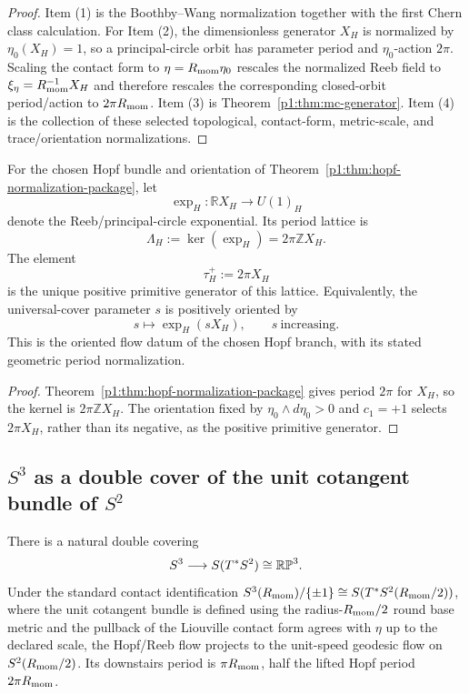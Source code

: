 \documentclass[11pt]{article}
\begin{document}
\begin{proof}
Item (1) is the Boothby--Wang normalization together with the first Chern class calculation. For Item (2), the dimensionless generator \(X_H\) is normalized by \(\eta_0(X_H)=1\), so a principal-circle orbit has parameter period and \(\eta_0\)-action \(2\pi\). Scaling the contact form to \(\eta=R_{\mathrm{mom}}\eta_0\) rescales the normalized Reeb field to \(\xi_\eta=R_{\mathrm{mom}}^{-1}X_H\) and therefore rescales the corresponding closed-orbit period/action to \(2\pi R_{\mathrm{mom}}\). Item (3) is Theorem~\ref{p1:thm:mc-generator}. Item (4) is the collection of these selected topological, contact-form, metric-scale, and trace/orientation normalizations.
\end{proof}

\begin{corollary}
\label{p1:cor:positive-reeb-lattice}
For the chosen Hopf bundle and orientation of
Theorem~\ref{p1:thm:hopf-normalization-package}, let
\[
 \exp_H:\mathbb R X_H\longrightarrow U(1)_H
\]
denote the Reeb/principal-circle exponential.  Its period lattice is
\[
 \Lambda_H:=\ker(\exp_H)=2\pi\mathbb Z X_H.
\]
The element
\[
 \boxed{\tau_H^+:=2\pi X_H}
\]
is the unique positive primitive generator of this lattice.  Equivalently,
the universal-cover parameter \(s\) is positively oriented by
\[
 s\longmapsto\exp_H(sX_H),\qquad s\ \text{increasing}.
\]
This is the oriented flow datum of the chosen Hopf branch, with its stated
geometric period normalization.
\end{corollary}

\begin{proof}
Theorem~\ref{p1:thm:hopf-normalization-package} gives period \(2\pi\) for
\(X_H\), so the kernel is \(2\pi\mathbb Z X_H\).  The orientation fixed by
\(\eta_0\wedge d\eta_0>0\) and \(c_1=+1\) selects \(2\pi X_H\), rather than
its negative, as the positive primitive generator.
\end{proof}


\subsection{\texorpdfstring{\(S^3\)}{S3} as a double cover of the unit cotangent bundle of \texorpdfstring{\(S^2\)}{S2}}
\label{p1:der:unit-cotangent-double-cover}

\begin{proposition}
\label{p1:prop:unit-cotangent-double-cover}
There is a natural double covering
\[
S^3 \longrightarrow S(T^*S^2)\cong \mathbb{RP}^3.
\]
Under the standard contact identification \(S^3(R_{\mathrm{mom}})/\{\pm1\}\cong S(T^*S^2(R_{\mathrm{mom}}/2))\), where the unit cotangent bundle is defined using the radius-\(R_{\mathrm{mom}}/2\) round base metric and the pullback of the Liouville contact form agrees with \(\eta\) up to the declared scale, the Hopf/Reeb flow projects to the unit-speed geodesic flow on \(S^2(R_{\mathrm{mom}}/2)\). Its downstairs period is \(\pi R_{\mathrm{mom}}\), half the lifted Hopf period \(2\pi R_{\mathrm{mom}}\).
\end{proposition}
\end{document}

